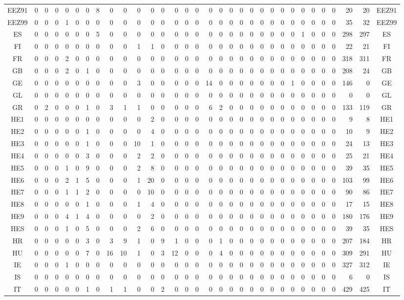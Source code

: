 \documentclass[10pt,a4paper,twoside]{report}
\begin{document}
{\begin{tabular}{crrrrrrrrrrrrrrrrrrrrrrrrrrrrrrc}
EEZ91&0&0&0&0&0&0&8&0&0&0&0&0&0&0&0&0&0&0&0&0&0&0&0&0&0&0&0&0&20&20&EEZ91\\
EEZ99&0&0&0&1&0&0&0&0&0&0&0&0&0&0&0&0&0&0&0&0&0&0&0&0&0&0&0&0&35&32&EEZ99\\
ES&0&0&0&0&0&0&5&0&0&0&0&0&0&0&0&0&0&0&0&0&0&0&0&0&1&0&0&0&298&297&ES\\
FI&0&0&0&0&0&0&0&0&0&1&1&0&0&0&0&0&0&0&0&0&0&0&0&0&0&0&0&0&22&21&FI\\
FR&0&0&0&2&0&0&0&0&0&0&0&0&0&0&0&0&0&0&0&0&0&0&0&0&0&0&0&0&318&311&FR\\
GB&0&0&0&2&0&1&0&0&0&0&0&0&0&0&0&0&0&0&0&0&0&0&0&0&0&0&0&0&208&24&GB\\
GE&0&0&0&0&0&0&0&0&0&3&0&0&0&0&0&14&0&0&0&0&0&0&0&1&0&0&0&0&146&0&GE\\
GL&0&0&0&0&0&0&0&0&0&0&0&0&0&0&0&0&0&0&0&0&0&0&0&0&0&0&0&0&0&0&GL\\
GR&0&2&0&0&0&1&0&3&1&1&0&0&0&0&0&6&2&0&0&0&0&0&0&0&0&0&0&0&133&119&GR\\
HE1&0&0&0&0&0&0&0&0&0&0&2&0&0&0&0&0&0&0&0&0&0&0&0&0&0&0&0&0&9&8&HE1\\
HE2&0&0&0&0&0&1&0&0&0&0&4&0&0&0&0&0&0&0&0&0&0&0&0&0&0&0&0&0&10&9&HE2\\
HE3&0&0&0&0&0&1&0&0&0&10&1&0&0&0&0&0&0&0&0&0&0&0&0&0&0&0&0&0&24&13&HE3\\
HE4&0&0&0&0&0&3&0&0&0&2&2&0&0&0&0&0&0&0&0&0&0&0&0&0&0&0&0&0&25&21&HE4\\
HE5&0&0&0&1&0&9&0&0&0&2&8&0&0&0&0&0&0&0&0&0&0&0&0&0&0&0&0&0&39&35&HE5\\
HE6&0&0&0&2&1&5&0&0&0&1&20&0&0&0&0&0&0&0&0&0&0&0&0&0&0&0&0&0&103&99&HE6\\
HE7&0&0&0&1&1&2&0&0&0&0&10&0&0&0&0&0&0&0&0&0&0&0&0&0&0&0&0&0&90&86&HE7\\
HE8&0&0&0&0&0&1&0&0&0&1&4&0&0&0&0&0&0&0&0&0&0&0&0&0&0&0&0&0&17&15&HE8\\
HE9&0&0&0&4&1&4&0&0&0&0&2&0&0&0&0&0&0&0&0&0&0&0&0&0&0&0&0&0&180&176&HE9\\
HES&0&0&0&1&0&5&0&0&0&2&6&0&0&0&0&0&0&0&0&0&0&0&0&0&0&0&0&0&39&35&HES\\
HR&0&0&0&0&0&3&0&3&9&1&0&9&1&0&0&0&1&0&0&0&0&0&0&0&0&0&0&0&207&184&HR\\
HU&0&0&0&0&0&7&0&16&10&1&0&3&12&0&0&0&4&0&0&0&0&0&0&0&0&0&0&0&309&291&HU\\
IE&0&0&0&1&0&0&0&0&0&0&0&0&0&0&0&0&0&0&0&0&0&0&0&0&0&0&0&0&327&312&IE\\
IS&0&0&0&0&0&0&0&0&0&0&0&0&0&0&0&0&0&0&0&0&0&0&0&0&0&0&0&0&6&0&IS\\
IT&0&0&0&0&0&1&0&1&1&0&0&2&0&0&0&0&0&0&0&0&0&0&0&0&0&0&0&0&429&425&IT\\

\end{tabular}}
\end{document}
